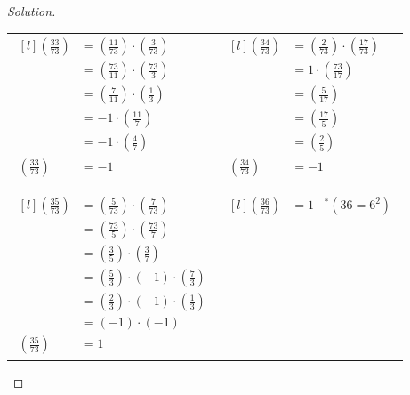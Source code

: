 \documentclass[11pt]{article}
\newcommand\leg[2]{\left(\frac{#1}{#2}\right)}
\newenvironment{solution}
  {\renewcommand\qedsymbol{$~$}\begin{proof}[Solution]$ $\par\nobreak\ignorespaces}
  {\end{proof}}
\begin{document}
\begin{solution}
  \renewcommand{\arraystretch}{1.3}
  \begin{NiceTabular}[width=0.95\textwidth]{X[l] !{\qquad} X[l]}
    $\begin{matrix*}[l]
         \leg{33}{73} &= \leg{11}{73}\cdot \leg{3}{73} \\
         &= \leg{73}{11} \cdot \leg{73}{3} \\
         &= \leg{7}{11} \cdot \leg{1}{3} \\
         &= -1\cdot \leg{11}{7} \\
         &= -1 \cdot \leg{4}{7} \\
         \leg{33}{73} &= -1 \\
       \end{matrix*}$
     &
    $\begin{matrix*}[l]
         \leg{34}{73} &= \leg{2}{73} \cdot \leg{17}{73} \\
         &= 1 \cdot \leg{73}{17} \\
         &= \leg{5}{17} \\
         &= \leg{17}{5} \\
         &= \leg{2}{5} \\
         \leg{34}{73} &= -1
       \end{matrix*}$ \\
    \phantom{space}                                 \\
    $\begin{matrix*}[l]
         \leg{35}{73} &= \leg{5}{73} \cdot \leg{7}{73} \\
         &= \leg{73}{5} \cdot \leg{73}{7} \\
         &= \leg{3}{5} \cdot \leg{3}{7} \\
         &= \leg{5}{3} \cdot (-1) \cdot \leg{7}{3} \\
         &= \leg{2}{3} \cdot (-1) \cdot \leg{1}{3} \\
         &= (-1) \cdot (-1) \\
         \leg{35}{73} &= 1
       \end{matrix*}$
     &
    $\begin{matrix*}[l]
         \leg{36}{73} &= 1 \;\;\; ^*(36=6^2) \\
         ~\\
         ~\\
         ~\\
         ~\\
         ~\\
         ~\\
       \end{matrix*}$
  \end{NiceTabular}
  \renewcommand{\arraystretch}{1}
\end{solution}
\end{document}
